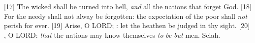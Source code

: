 [17] \textcolor[cmyk]{0.99998,1,0,0}{The wicked shall be turned into hell, \emph{and} all the nations that forget God.}
[18] \textcolor[cmyk]{0.99998,1,0,0}{For the needy shall not alway be forgotten: the expectation of the poor shall \emph{not} perish for ever.}
[19] \textcolor[cmyk]{0.99998,1,0,0}{Arise, O LORD; : let the heathen be judged in thy sight.}
[20] \textcolor[cmyk]{0.99998,1,0,0}{, O LORD: \emph{that} the nations may know themselves \emph{to} \emph{be} \emph{but} men. Selah.}



